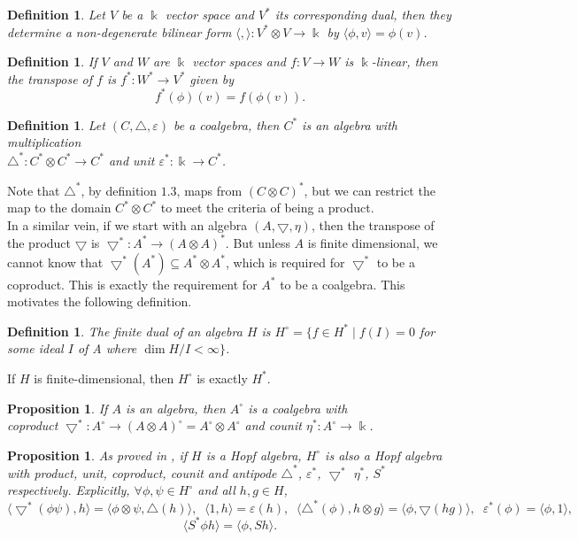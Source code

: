 \documentclass[12pt,a4paper]{article}
\newtheorem{proposition}[theorem]{Proposition}
\newtheorem{definition}[theorem]{Definition}
\newcommand{\kk}{\Bbbk}
\newcommand\1{_{(1)}}
\newcommand\2{_{(2)}}
\begin{document}
\begin{definition}
    Let $V$ be a $\kk$ vector space and $V^*$ its corresponding dual, then they determine a non-degenerate bilinear form $\langle,\rangle:V^*\otimes V\to\kk$ by $\langle\phi,v\rangle=\phi(v)$.
\end{definition}

\begin{definition}
    If $V$ and $W$ are $\kk$ vector spaces and $f:V\to W$ is $\kk$-linear, then the transpose of $f$ is $f^*:W^*\to V^*$ given by 
    \[
    f^*(\phi)(v)=f(\phi(v)).
    \]
\end{definition}

\begin{definition}
    Let $(C,\triangle,\varepsilon)$ be a coalgebra, then $C^*$ is an algebra with multiplication \\$\triangle^*:C^*\otimes C^*\to C^*$ and unit $\varepsilon^*:\kk\to C^*$.
\end{definition}

Note that $\triangle^*$, by definition $1.3$, maps from $(C\otimes C)^*$, but we can restrict the map to the domain $C^*\otimes C^*$ to meet the criteria of being a product.\\

In a similar vein, if we start with an algebra $(A,\bigtriangledown,\eta)$, then the transpose of the product $\bigtriangledown$ is $\bigtriangledown^*:A^*\to (A\otimes A)^*$.
But unless $A$ is finite dimensional, we cannot know that $\bigtriangledown^*(A^*)\subseteq A^*\otimes A^*$, which is required for $\bigtriangledown^*$ to be a coproduct.
This is exactly the requirement for $A^*$ to be a coalgebra.
This motivates the following definition.

\begin{definition}
The finite dual of an algebra $H$ is $H^\circ=\{f\in H^*\;\vert\; f(I)=0$ for some ideal $I$ of A where $\dim H/I<\infty\}$. 
\end{definition}

If $H$ is finite-dimensional, then $H^\circ$ is exactly $H^*$.

\begin{proposition}
If $A$ is an algebra, then $A^\circ$ is a coalgebra with\\ coproduct $\bigtriangledown^*:A^\circ\to(A\otimes A)^\circ=A^\circ\otimes A^\circ$ and counit $\eta^*:A^\circ\to\kk$.
\end{proposition}

\begin{proposition}
As proved in \cite{Maj}, if $H$ is a Hopf algebra, $H^\circ$ is also a Hopf algebra with product, unit, coproduct, counit and antipode $\triangle^*$, $\varepsilon^*$, $\bigtriangledown^*$ $\eta^*$, $S^*$ respectively.
Explicitly, $\forall \phi,\psi\in H^\circ$ and all $h,g\in H$,
\[
\langle\bigtriangledown^*(\phi\psi),h\rangle=\langle\phi\otimes\psi,\triangle(h)\rangle , \;\; \langle1,h\rangle=\varepsilon(h), \;\; \langle\triangle^*(\phi),h\otimes g\rangle =\langle\phi, \bigtriangledown(hg)\rangle,\;\; \varepsilon^*(\phi)=\langle\phi,1\rangle ,
\]\[
\langle S^*\phi h\rangle =\langle \phi,Sh\rangle .
\]
\end{proposition}
\end{document}
